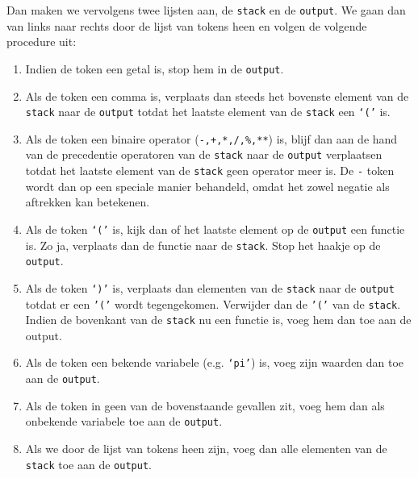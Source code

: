 \documentclass[a4paper]{article}
\newcommand{\ttt}[1]{\texttt{#1}}
\begin{document}
Dan maken we vervolgens twee lijsten aan, de \ttt{stack} en de \ttt{output}. We gaan dan van links naar rechts door de lijst van tokens heen en volgen de volgende procedure uit:
\begin{enumerate}
\item Indien de token een getal is, stop hem in de \ttt{output}.
\item Als de token een comma is, verplaats dan steeds het bovenste element van de \ttt{stack} naar de \ttt{output} totdat het laatste element van de \ttt{stack} een \ttt{`('} is.
\item Als de token een binaire operator (\ttt{-,+,*,/,\%,**}) is,  blijf dan aan de hand van de precedentie operatoren van de \ttt{stack} naar de \ttt{output} verplaatsen totdat het laatste element van de \ttt{stack} geen operator meer is. De \ttt- token wordt dan op een speciale manier behandeld, omdat het zowel negatie als aftrekken kan betekenen.
\item Als de token \ttt{`('} is, kijk dan of het laatste element op de \ttt{output} een functie is. Zo ja, verplaats dan de functie naar de \ttt{stack}. Stop het haakje op de \ttt{output}.
\item Als de token \ttt{`)'} is, verplaats dan elementen van de \ttt{stack} naar de \ttt{output} totdat er een \ttt{'('} wordt tegengekomen. Verwijder dan de \ttt{'('} van de \ttt{stack}. Indien de bovenkant van de \ttt{stack} nu een functie is, voeg hem dan toe aan de output.
\item Als de token een bekende variabele (e.g. \ttt{`pi'}) is, voeg zijn waarden dan toe aan de \ttt{output}.
\item Als de token in geen van de bovenstaande gevallen zit, voeg hem dan als onbekende variabele toe aan de \ttt{output}.
\item Als we door de lijst van tokens heen zijn, voeg dan alle elementen van de \ttt{stack} toe aan de \ttt{output}.
\end{enumerate}
\end{document}
